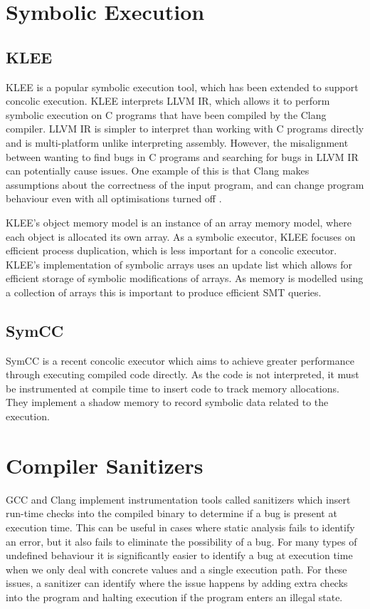 \documentclass[12pt,twoside]{report}
\begin{document}
\section{Symbolic Execution}
\subsection{KLEE}
KLEE \cite{cadar2008klee} is a popular symbolic execution tool, which has been extended to support concolic execution. KLEE interprets LLVM IR, which allows it to perform symbolic execution on C programs that have been compiled by the Clang compiler. LLVM IR is simpler to interpret than working with C programs directly and is multi-platform unlike interpreting assembly. However, the misalignment between wanting to find bugs in C programs and searching for bugs in LLVM IR can potentially cause issues. One example of this is that Clang makes assumptions about the correctness of the input program, and can change program behaviour even with all optimisations turned off \cite{unstable code paper}.

KLEE's object memory model is an instance of an array memory model, where each object is allocated its own array. As a symbolic executor, KLEE focuses on efficient process duplication, which is less important for a concolic executor. KLEE's implementation of symbolic arrays uses an update list which allows for efficient storage of symbolic modifications of arrays. As memory is modelled using a collection of arrays this is important to produce efficient SMT queries.

\subsection{SymCC}
 SymCC \cite{poeplau2020symbolic} is a recent concolic executor which aims to achieve greater performance through executing compiled code directly. As the code is not interpreted, it must be instrumented at compile time to insert code to track memory allocations. They implement a shadow memory to record symbolic data related to the execution. 


\section{Compiler Sanitizers}
GCC and Clang implement instrumentation tools called sanitizers which insert run-time checks into the compiled binary to determine if a bug is present at execution time. This can be useful in cases where static analysis fails to identify an error, but it also fails to eliminate the possibility of a bug. For many types of undefined behaviour it is significantly easier to identify a bug at execution time when we only deal with concrete values and a single execution path. For these issues, a sanitizer can identify where the issue happens by adding extra checks into the program and halting execution if the program enters an illegal state.
\end{document}
